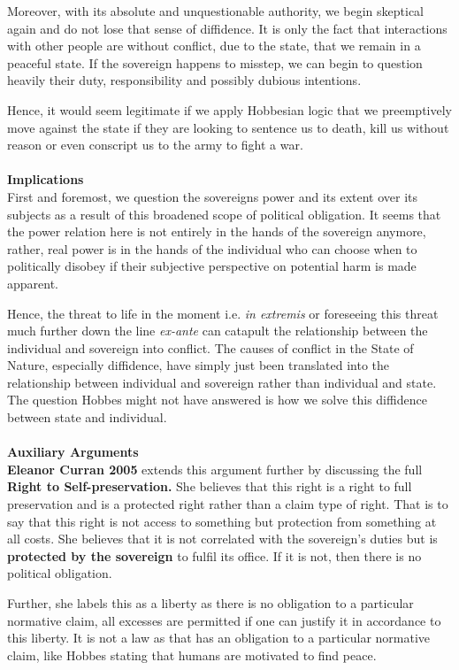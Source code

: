 \documentclass[12pt, letterpaper]{article}
\begin{document}
Moreover, with its absolute and unquestionable authority, we begin skeptical again and do not lose that sense of diffidence. It is only the fact that interactions with other people are without conflict, due to the state, that we remain in a peaceful state. If the sovereign happens to misstep, we can begin to question heavily their duty, responsibility and possibly dubious intentions.

Hence, it would seem legitimate if we apply Hobbesian logic that we preemptively move against the state if they are looking to sentence us to death, kill us without reason or even conscript us to the army to fight a war.\\\\
\textbf{Implications}\\
First and foremost, we question the sovereigns power and its extent over its subjects as a result of this broadened scope of political obligation. It seems that the power relation here is not entirely in the hands of the sovereign anymore, rather, real power is in the hands of the individual who can choose when to politically disobey if their subjective perspective on potential harm is made apparent.

Hence, the threat to life in the moment i.e. \textit{in extremis} or foreseeing this threat much further down the line \textit{ex-ante} can catapult the relationship between the individual and sovereign into conflict. The causes of conflict in the State of Nature, especially diffidence, have simply just been translated into the relationship between individual and sovereign rather than individual and state. The question Hobbes might not have answered is how we solve this diffidence between state and individual.\\\\
\textbf{Auxiliary Arguments}\\
\textbf{Eleanor Curran 2005} extends this argument further by discussing the full \textbf{Right to Self-preservation.} She believes that this right is a right to full preservation and is a protected right rather than a claim type of right. That is to say that this right is not access to something but protection from something at all costs. She believes that it is not correlated with the sovereign's duties but is \textbf{protected by the sovereign} to fulfil its office. If it is not, then there is no political obligation.

Further, she labels this as a liberty as there is no obligation to a particular normative claim, all excesses are permitted if one can justify it in accordance to this liberty. It is not a law as that has an obligation to a particular normative claim, like Hobbes stating that humans are motivated to find peace.
\end{document}
